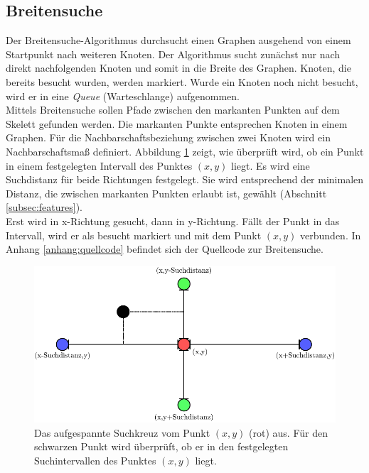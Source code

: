 \subsection{Breitensuche}
\label{subsec:breitesuche}
Der Breitensuche-Algorithmus durchsucht einen Graphen ausgehend von einem Startpunkt nach weiteren 
Knoten. Der Algorithmus sucht zunächst nur nach direkt nachfolgenden Knoten und somit in die Breite des
Graphen. Knoten, die bereits besucht wurden, werden markiert. Wurde ein Knoten noch nicht besucht, wird er
in eine \emph{Queue} (Warteschlange) aufgenommen.\\
Mittels Breitensuche sollen Pfade zwischen den markanten Punkten auf dem Skelett gefunden werden. Die markanten Punkte entsprechen Knoten in einem Graphen. Für die Nachbarschaftsbeziehung zwischen zwei
Knoten wird ein Nachbarschaftsmaß definiert. Abbildung \ref{fig:suchdistanz_naechster_nachbar} zeigt, wie überprüft wird, ob ein Punkt in einem festgelegten Intervall des Punktes $(x,y)$ liegt. Es wird eine Suchdistanz für beide Richtungen festgelegt. Sie
wird entsprechend der minimalen Distanz, die zwischen markanten Punkten erlaubt ist, gewählt (Abschnitt \ref{subsec:features}). \\
Erst wird in x-Richtung gesucht, dann in y-Richtung. Fällt der Punkt in das Intervall, wird er als besucht markiert und
mit dem Punkt $(x,y)$ verbunden. In Anhang \ref{anhang:quellcode} befindet sich der Quellcode zur Breitensuche.
\begin{figure}[htbp]
\centering
\includegraphics[width=1.0\linewidth]{./fig/suchdistanz_naechster_nachbar}
\caption{Das aufgespannte Suchkreuz vom Punkt $(x,y)$ (rot) aus. Für den schwarzen Punkt wird überprüft, ob er in den festgelegten Suchintervallen des Punktes $(x,y)$ liegt.}
\label{fig:suchdistanz_naechster_nachbar}
\end{figure}\\
